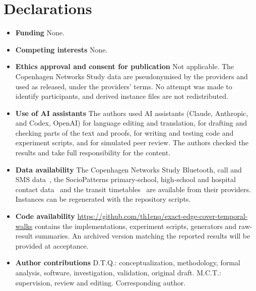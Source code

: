 \section*{Declarations}
\begin{itemize}
\item \textbf{Funding} None.
\item \textbf{Competing interests} None.
\item \textbf{Ethics approval and consent for publication} Not applicable. The Copenhagen Networks Study data are pseudonymised by the providers and used as released, under the providers' terms. No attempt was made to identify participants, and derived instance files are not redistributed.
\item \textbf{Use of AI assistants} The authors used AI assistants (Claude, Anthropic, and Codex, OpenAI) for language editing and translation, for drafting and checking parts of the text and proofs, for writing and testing code and experiment scripts, and for simulated peer review. The authors checked the results and take full responsibility for the content.
\item \textbf{Data availability} The Copenhagen Networks Study Bluetooth, call and SMS data~\cite{sapiezynski2019}, the SocioPatterns primary-school, high-school and hospital contact data~\cite{stehle2011,fournet2014,mastrandrea2015,vanhems2013} and the transit timetables~\cite{kujala2018} are available from their providers. Instances can be regenerated with the repository scripts.
\item \textbf{Code availability} \url{https://github.com/th1enq/exact-edge-cover-temporal-walks} contains the implementations, experiment scripts, generators and raw-result summaries. An archived version matching the reported results will be provided at acceptance.
\item \textbf{Author contributions} D.T.Q.: conceptualization, methodology, formal analysis, software, investigation, validation, original draft. M.C.T.: supervision, review and editing. Corresponding author.
\end{itemize}
